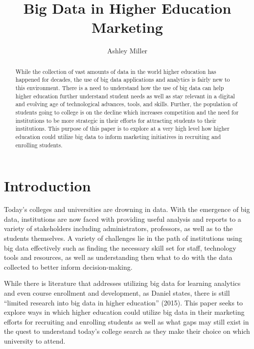 \documentclass[sigconf]{acmart}
\begin{document}
\title{Big Data in Higher Education Marketing}


\author{Ashley Miller}



\renewcommand{\shortauthors}{B. Trovato et al.}


\begin{abstract}
While the collection of vast amounts of data in the world higher education has happened for decades, the use of big data applications and analytics is fairly new to this environment. There is a need to understand how the use of big data can help higher education further understand student needs as well as stay relevant in a digital and evolving age of technological advances, tools, and skills. Further, the population of students going to college is on the decline which increases competition and the need for institutions to be more strategic in their efforts for attracting students to their institutions. This purpose of this paper is to explore at a very high level how higher education could utilize big data to inform marketing initiatives in recruiting and enrolling students. 
\end{abstract}



\maketitle

\section{Introduction}

Today’s colleges and universities are drowning in data. With the emergence of big data, institutions are now faced with providing useful analysis and reports to a variety of stakeholders including administrators, professors, as well as to the students themselves. A variety of challenges lie in the path of institutions using big data effectively such as finding the necessary skill set for staff, technology tools and resources, as well as understanding then what to do with the data collected to better inform decision-making. 

While there is literature that addresses utilizing big data for learning analytics and even course enrollment and development, as Daniel states, there is still “limited research into big data in higher education” (2015).  This paper seeks to explore ways in which higher education could utilize big data in their marketing efforts for recruiting and enrolling students as well as what gaps may still exist in the quest to understand today’s college search as they make their choice on which university to attend. 
\end{document}
